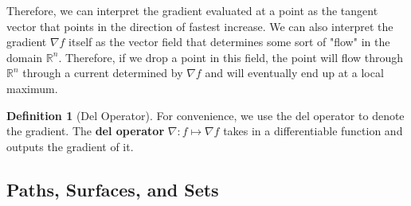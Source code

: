\documentclass{article}
\theoremstyle{remark}
\theoremstyle{definition}
\newtheorem{definition}{Definition}[section]
\begin{document}
Therefore, we can interpret the gradient evaluated at a point as the tangent vector that points in the direction of fastest increase. We can also interpret the gradient $\nabla f$ itself as the vector field that determines some sort of "flow" in the domain $\mathbb{R}^n$. Therefore, if we drop a point in this field, the point will flow through $\mathbb{R}^n$ through a current determined by $\nabla f$ and will eventually end up at a local maximum. 

\begin{definition}[Del Operator]
For convenience, we use the del operator to denote the gradient. The \textbf{del operator} $\nabla: f \mapsto \nabla f$ takes in a differentiable function and outputs the gradient of it. 
\end{definition}

\subsection{Paths, Surfaces, and Sets}
\end{document}
